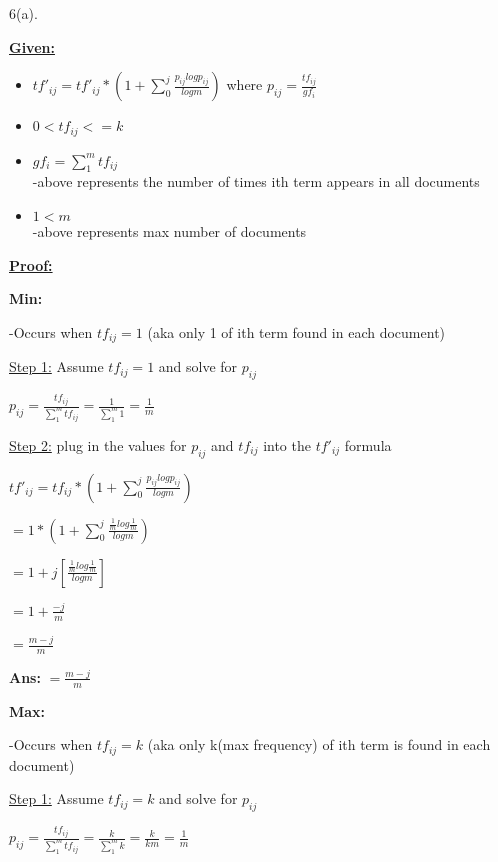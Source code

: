 \documentclass[11pt]{article}
\begin{document}
6(a).

\underline{\textbf{Given:}}
\begin{itemize}
	\item $tf'_{ij} = tf'_{ij} * (1+ \sum_0^j \frac{p_{ij}logp_{ij}}{logm})$ where $p_{ij} = \frac{tf_{ij}}{gf_i}$
	\item $0< tf_{ij} <=k $
	\item $gf_i = \sum_1^m tf_{ij}$ \\-above represents the number of times 
	ith term appears in all documents
	\item $1<m$ \\-above represents max number of documents
\end{itemize}


\vspace{5mm}
\underline{\textbf{Proof:}}

\textbf{Min:} 

-Occurs when $tf_{ij} =1$ (aka only 1 of ith term found in each document)

\vspace{5mm}
\underline{Step 1:} Assume $tf_{ij} =1$ and solve for $p_{ij}$ 

$p_{ij} = \frac{tf_{ij}}{\sum_1^m tf_{ij}} = \frac{1}{\sum_1^m 1} = \frac {1}{m}$

\vspace{5mm}
\underline{Step 2:} plug in the values for $p_{ij}$ and $tf_{ij}$ into the $tf'_{ij}$ formula
 
 $tf'_{ij} = tf_{ij} * (1+ \sum_0^j \frac{p_{ij}logp_{ij}}{logm})$
 
 \qquad $ = 1 * (1 + \sum_0^j \frac{\frac{1}{m}log\frac{1}{m}}{logm})$
 
 \qquad $ = 1+ j[\frac{\frac{1}{m}log\frac{1}{m}}{logm}]$
 
 \qquad $= 1 + \frac{-j}{m}$
 
 \qquad $=\frac{m-j}{m}$
 
 \vspace{5mm}
 \textbf{Ans:} $=\frac{m-j}{m}$
 
\vspace{5mm}
\textbf{Max:}

-Occurs when $tf_{ij} =k$ (aka only k(max frequency) of ith term is found in each document)

\vspace{5mm}
\underline{Step 1:} Assume $tf_{ij} =k$ and solve for $p_{ij}$ 

$p_{ij} = \frac{tf_{ij}}{\sum_1^m tf_{ij}} = \frac{k}{\sum_1^m k} = \frac {k}{km} = \frac{1}{m}$
\end{document}
